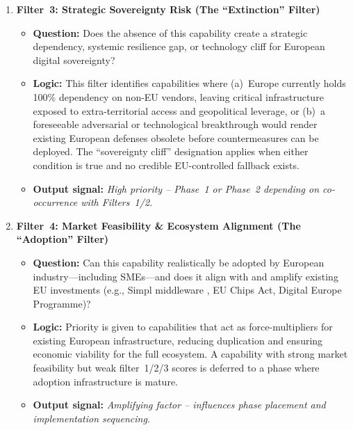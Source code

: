 \documentclass{ieeeaccess}
\begin{document}
\begin{enumerate}
    \item \textbf{Filter~3: Strategic Sovereignty Risk (The ``Extinction'' Filter)}
    \begin{itemize}
        \item \textbf{Question:} Does the absence of this capability create a
        strategic dependency, systemic resilience gap, or technology cliff
        for European digital sovereignty?
        \item \textbf{Logic:} This filter identifies capabilities where
        (a)~Europe currently holds 100\% dependency on non-EU vendors, leaving
        critical infrastructure exposed to extra-territorial access and
        geopolitical leverage, or (b)~a foreseeable adversarial or technological
        breakthrough would render existing European defenses obsolete before
        countermeasures can be deployed. The ``sovereignty cliff'' designation
        applies when either condition is true and no credible EU-controlled
        fallback exists.
        \item \textbf{Output signal:} \emph{High priority -- Phase~1 or Phase~2
        depending on co-occurrence with Filters~1/2.}
    \end{itemize}

    \item \textbf{Filter~4: Market Feasibility \& Ecosystem Alignment
    (The ``Adoption'' Filter)}
    \begin{itemize}
        \item \textbf{Question:} Can this capability realistically be adopted
        by European industry---including SMEs---and does it align with and
        amplify existing EU investments (e.g., Simpl middleware
        \cite{cloud_edge_roadmap}, EU Chips Act, Digital Europe Programme)?
        \item \textbf{Logic:} Priority is given to capabilities that act as
        force-multipliers for existing European infrastructure, reducing
        duplication and ensuring economic viability for the full ecosystem.
        A capability with strong market feasibility but weak filter~1/2/3
        scores is deferred to a phase where adoption infrastructure is mature.
        \item \textbf{Output signal:} \emph{Amplifying factor -- influences
        phase placement and implementation sequencing.}
    \end{itemize}

\end{enumerate}
\end{document}
